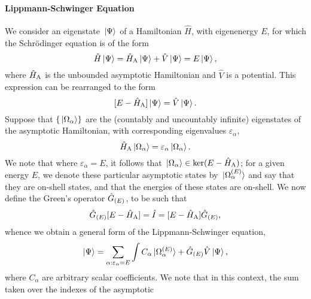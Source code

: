 \documentclass[]{article}
\begin{document}
\paragraph{Lippmann-Schwinger Equation}
\label{sec:th-ccc-eq-ls}

We consider an eigenstate $\ket*{\Psi}$ of a Hamiltonian $\hat{H}$, with
eigenenergy $E$, for which the Schr\"odinger equation is of the form
\begin{equation}
  \label{eq:schrodinger}
  \hat{H}
  \ket{\Psi}
  =
  \hat{H}_{\rm{A}}
  \ket{\Psi}
  +
  \hat{V}
  \ket{\Psi}
  =
  E
  \ket{\Psi}
  ,
\end{equation}
where $\hat{H}_{\rm{A}}$ is the unbounded asymptotic Hamiltonian and $\hat{V}$
is a potential.
This expression can be rearranged to the form
\begin{equation}
  \label{eq:schrodinger-2}
  [
    E
    -
    \hat{H}_{\rm{A}}
  ]
  \ket{\Psi}
  =
  \hat{V}
  \ket{\Psi}
  .
\end{equation}
Suppose that $\lbrace\ket*{\Omega_{\alpha}}\rbrace$ are the (countably and
uncountably infinite) eigenstates of the asymptotic Hamiltonian, with
corresponding eigenvalues
$\varepsilon_{\alpha}$,
\begin{equation}
  \label{eq:schrodinger-asymptotic}
  \hat{H}_{\rm{A}}
  \ket{\Omega_{\alpha}}
  =
  \varepsilon_{\alpha}
  \ket{\Omega_{\alpha}}
  .
\end{equation}
We note that where $\varepsilon_{\alpha} = E$, it follows that
$\ket*{\Omega_{\alpha}} \in \ker(E - \hat{H}_{\rm{A}})$; for a given energy
$E$, we denote these particular asymptotic states by
$\ket*{\Omega_{\alpha}^{(E)}}$ and say that they are on-shell states, and
that the energies of these states are on-shell.
We now define the Green's operator $\hat{G}_{(E)}$, to be such that
\begin{equation}
  \label{eq:greens-operator}
  \hat{G}_{(E)}
  [
    E
    -
    \hat{H}_{\rm{A}}
  ]
  =
  \hat{I}
  =
  [
    E
    -
    \hat{H}_{\rm{A}}
  ]
  \hat{G}_{(E)}
  ,
\end{equation}
whence we obtain a general form of the Lippmann-Schwinger equation,
\begin{equation}
  \label{eq:ls}
  \ket{\Psi}
  =
  \sum_{\alpha : \varepsilon_{\alpha} = E}\int
  C_{\alpha}
  \ket*{\Omega_{\alpha}^{(E)}}
  +
  \hat{G}_{(E)}
  \hat{V}
  \ket{\Psi}
  ,
\end{equation}
where $C_{\alpha}$ are arbitrary scalar coefficients.
We note that in this context, the sum taken over the indexes of the asymptotic
\end{document}
